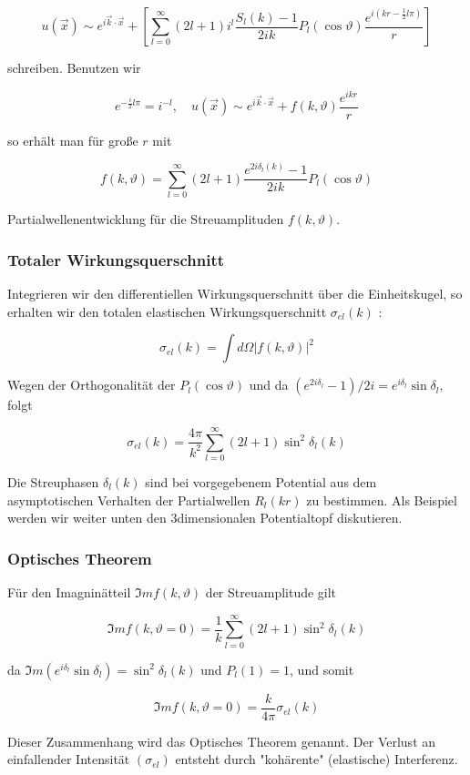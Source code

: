 \documentclass[10pt, letterpaper]{article}
\begin{document}
$$
u(\vec{x}) \sim e^{i \vec{k} \cdot \vec{x}}+\left[\sum_{l=0}^{\infty}(2 l+1) i^{l} \frac{S_{l}(k)-1}{2 i k} P_{l}(\cos \vartheta) \frac{e^{i\left(k r-\frac{1}{2} l \pi\right)}}{r}\right]
$$

schreiben. Benutzen wir

$$
e^{-\frac{i}{2} l \pi}=i^{-l}, \quad u(\vec{x}) \sim e^{i \vec{k} \cdot \vec{x}}+f(k, \vartheta) \frac{e^{i k r}}{r}
$$

so erhält man für große $r$ mit

$$
f(k, \vartheta)=\sum_{l=0}^{\infty}(2 l+1) \frac{e^{2 i \delta_{l}(k)}-1}{2 i k} P_{l}(\cos \vartheta)
$$

Partialwellenentwicklung für die Streuamplituden $f(k, \vartheta)$.

\subsubsection*{Totaler Wirkungsquerschnitt}
Integrieren wir den differentiellen Wirkungsquerschnitt über die Einheitskugel, so erhalten wir den totalen elastischen Wirkungsquerschnitt $\sigma_{e l}(k)$ :

$$
\sigma_{e l}(k)=\int d \Omega|f(k, \vartheta)|^{2}
$$

Wegen der Orthogonalität der $P_{l}(\cos \vartheta)$ und da $\left(e^{2 i \delta_{l}}-1\right) / 2 i=e^{i \delta_{l}} \sin \delta_{l}$, folgt

$$
\sigma_{e l}(k)=\frac{4 \pi}{k^{2}} \sum_{l=0}^{\infty}(2 l+1) \sin ^{2} \delta_{l}(k)
$$

Die Streuphasen $\delta_{l}(k)$ sind bei vorgegebenem Potential aus dem asymptotischen Verhalten der Partialwellen $R_{l}(k r)$ zu bestimmen. Als Beispiel werden wir weiter unten den 3dimensionalen Potentialtopf diskutieren.

\subsubsection*{Optisches Theorem}
Für den Imagninätteil $\Im m f(k, \vartheta)$ der Streuamplitude gilt

$$
\Im m f(k, \vartheta=0)=\frac{1}{k} \sum_{l=0}^{\infty}(2 l+1) \sin ^{2} \delta_{l}(k)
$$

da $\Im m\left(e^{i \delta_{l}} \sin \delta_{l}\right)=\sin ^{2} \delta_{l}(k)$ und $P_{l}(1)=1$, und somit

$$
\Im m f(k, \vartheta=0)=\frac{k}{4 \pi} \sigma_{e l}(k)
$$

Dieser Zusammenhang wird das Optisches Theorem genannt. Der Verlust an einfallender Intensität $\left(\sigma_{e l}\right)$ entsteht durch "kohärente" (elastische) Interferenz.
\end{document}
